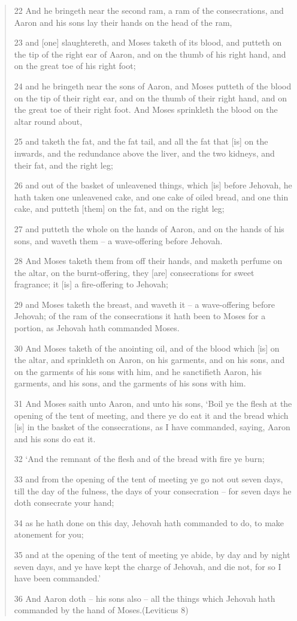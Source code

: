 \documentclass[11pt]{article}
\begin{document}
\begin{quote}
22 And he bringeth near the second ram, a ram of the consecrations, and Aaron and his sons lay their hands on the head of the ram,

23 and [one] slaughtereth, and Moses taketh of its blood, and putteth on the tip of the right ear of Aaron, and on the thumb of his right hand, and on the great toe of his right foot;

24 and he bringeth near the sons of Aaron, and Moses putteth of the blood on the tip of their right ear, and on the thumb of their right hand, and on the great toe of their right foot. And Moses sprinkleth the blood on the altar round about,

25 and taketh the fat, and the fat tail, and all the fat that [is] on the inwards, and the redundance above the liver, and the two kidneys, and their fat, and the right leg;

26 and out of the basket of unleavened things, which [is] before Jehovah, he hath taken one unleavened cake, and one cake of oiled bread, and one thin cake, and putteth [them] on the fat, and on the right leg;

27 and putteth the whole on the hands of Aaron, and on the hands of his sons, and waveth them -- a wave-offering before Jehovah.

28 And Moses taketh them from off their hands, and maketh perfume on the altar, on the burnt-offering, they [are] consecrations for sweet fragrance; it [is] a fire-offering to Jehovah;

29 and Moses taketh the breast, and waveth it -- a wave-offering before Jehovah; of the ram of the consecrations it hath been to Moses for a portion, as Jehovah hath commanded Moses.

30 And Moses taketh of the anointing oil, and of the blood which [is] on the altar, and sprinkleth on Aaron, on his garments, and on his sons, and on the garments of his sons with him, and he sanctifieth Aaron, his garments, and his sons, and the garments of his sons with him.

31 And Moses saith unto Aaron, and unto his sons, `Boil ye the flesh at the opening of the tent of meeting, and there ye do eat it and the bread which [is] in the basket of the consecrations, as I have commanded, saying, Aaron and his sons do eat it.

32 `And the remnant of the flesh and of the bread with fire ye burn;

33 and from the opening of the tent of meeting ye go not out seven days, till the day of the fulness, the days of your consecration -- for seven days he doth consecrate your hand;

34 as he hath done on this day, Jehovah hath commanded to do, to make atonement for you;

35 and at the opening of the tent of meeting ye abide, by day and by night seven days, and ye have kept the charge of Jehovah, and die not, for so I have been commanded.'

36 And Aaron doth -- his sons also -- all the things which Jehovah hath commanded by the hand of Moses.(Leviticus 8)
\end{quote}
\end{document}
